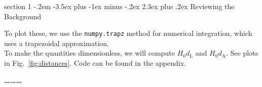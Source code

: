 \documentclass[12pt]{article}
\makeatletter
\newenvironment{problem}{\@startsection
	{section}
	{1}
	{-.2em}
	{-3.5ex plus -1ex minus -.2ex}
	{2.3ex plus .2ex}
	{\pagebreak[3]%
		\large\bf\noindent{Problem }
	}
}
{%
	\begin{center}\large\bf \ldots\ldots\ldots\end{center}}
\makeatother
\begin{document}
\begin{problem}{Reviewing the Background}
\begin{description}
			To plot these, we use the \texttt{numpy.trapz} method for numerical integration, which uses a trapezoidal approximation.\\
			
			To make the quantities dimensionless, we will compute $H_0d_\mathrm{L}$ and $H_0d_\mathrm{A}$.  See plots in Fig.~\ref{fig:distances}.  Code can be found in the appendix.
			
			\begin{figure}
				\centering
\end{figure}
\end{description}
\end{problem}
\end{document}

